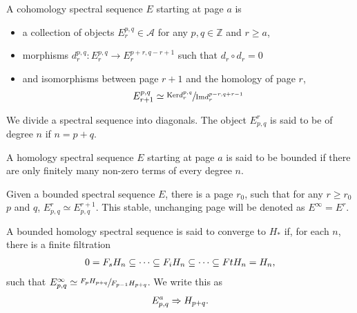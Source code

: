 \documentclass[../thesis.tex]{subfiles}
\begin{document}
        \begin{definition}
            A cohomology spectral sequence $E$ starting at page $a$ is
            \begin{itemize}
                \item a collection of objects $E_r^{p,q} \in \mathcal{A}$ for any $p,q \in \mathbb{Z}$ and $r \geq a$,
                \item morphisms $d_r^{p,q} : E_r^{p,q} \rightarrow E_r^{p+r, q-r+1}$ such that $d_r\circ d_r = 0$
                \item and isomorphisms between page $r+1$ and the homology of page $r$,
                \begin{align*}
                    E_{r+1}^{p,q} \simeq \sfrac{\tt{Ker}d_r^{p,q}}{\tt{Im}d_r^{p-r,q+r-1}}
                \end{align*}
            \end{itemize}
        \end{definition}

        We divide a spectral sequence into diagonals. The object $E^r_{p,q}$ is said to be of degree $n$ if $n = p + q$.

        \begin{definition}
            A homology spectral sequence $E$ starting at page $a$ is said to be bounded if there are only finitely many non-zero terms of every degree $n$.
        \end{definition}

        Given a bounded spectral sequence $E$, there is a page $r_0$, such that for any $r \geq r_0$ $p$ and $q$, $E^r_{p,q} \simeq E^{r+1}_{p,q}$. This stable, unchanging page will be denoted as $E^\infty = E^r$.

        \begin{definition}
            A bounded homology spectral sequence is said to converge to $H_*$ if, for each $n$, there is a finite filtration
            \begin{align*}
                0 = F_sH_n \subseteq \cdots \subseteq F_iH_n \subseteq \cdots \subseteq FtH_n = H_n\tt{,}
            \end{align*}
            such that $E^\infty_{p,q} \simeq \sfrac{F_pH_{p+q}}{F_{p-1}H_{p+q}}$. We write this as
            \begin{align*}
                E^a_{p,q} \Rightarrow H_{p+q}\tt{.}
            \end{align*}
        \end{definition}
\end{document}
